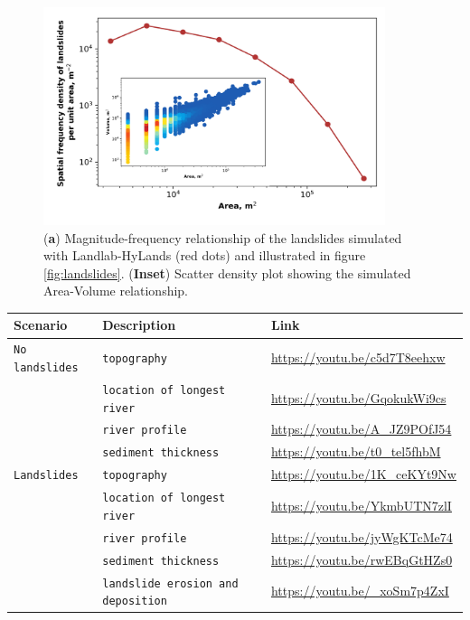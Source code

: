 \documentclass{article} %
\begin{document}
\begin{figure}[t]
\includegraphics[width=10cm]{Figures/LS-Mag-Freq.png}
\caption{(\textbf{a}) Magnitude-frequency relationship of the landslides simulated with Landlab-HyLands (red dots) and illustrated in figure \ref{fig:landslides}. (\textbf{Inset}) Scatter density plot showing the simulated Area-Volume relationship.}
\label{fig:MF-landslides}
\end{figure}

\begin{table}[htbp]
    \begin{tabular}{lll}
        \hline
        Scenario & Description & Link\\
        \hline\hline
        \verb|No landslides| &\verb|topography | & \url{https://youtu.be/c5d7T8eehxw} \\
        \verb|| &\verb|location of longest river|& \url{https://youtu.be/GqokukWi9cs} \\
        \verb|| &\verb|river profile |& \url{https://youtu.be/A_JZ9POfJ54} \\
        \verb|| &\verb|sediment thickness |& \url{https://youtu.be/t0_tel5fhbM} \\
        
        \verb|Landslides| &\verb|topography | & \url{https://youtu.be/1K_ceKYt9Nw} \\
        \verb|| &\verb|location of longest river|& \url{https://youtu.be/YkmbUTN7zlI} \\
        \verb|| &\verb|river profile |& \url{https://youtu.be/jyWgKTcMe74} \\
        \verb|| &\verb|sediment thickness |& \url{https://youtu.be/rwEBqGtHZs0} \\
        \verb|| &\verb|landslide erosion and deposition |& \url{https://youtu.be/_xoSm7p4ZxI} \\
    \hline
   \end{tabular}
   \label{tab:LS-movies}
\end{table} 
\end{document}
